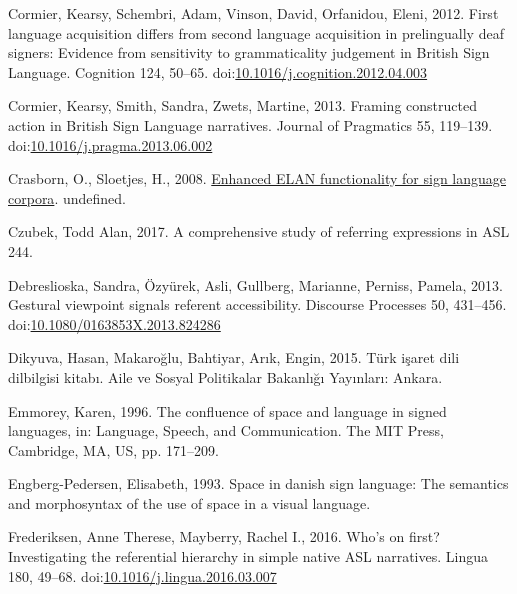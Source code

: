 \documentclass[]{elsarticle} %
\newlength{\cslhangindent}
\newenvironment{CSLReferences}[2] %
 {%
  \setlength{\parindent}{0pt}
  \ifodd #1 \everypar{\setlength{\hangindent}{\cslhangindent}}\ignorespaces\fi
  \ifnum #2 > 0
  \setlength{\parskip}{#2\baselineskip}
  \fi
 }%
 {}
\begin{document}
\begin{CSLReferences}{1}{0}
\leavevmode{}%
Cormier, Kearsy, Schembri, Adam, Vinson, David, Orfanidou, Eleni, 2012.
First language acquisition differs from second language acquisition in
prelingually deaf signers: Evidence from sensitivity to grammaticality
judgement in British Sign Language. Cognition 124, 50--65.
doi:\href{https://doi.org/10.1016/j.cognition.2012.04.003}{10.1016/j.cognition.2012.04.003}

\leavevmode{}%
Cormier, Kearsy, Smith, Sandra, Zwets, Martine, 2013. Framing
constructed action in British Sign Language narratives. Journal of
Pragmatics 55, 119--139.
doi:\href{https://doi.org/10.1016/j.pragma.2013.06.002}{10.1016/j.pragma.2013.06.002}

\leavevmode{}%
Crasborn, O., Sloetjes, H., 2008.
\href{https://www.semanticscholar.org/paper/Enhanced-ELAN-functionality-for-sign-language-Crasborn-Sloetjes/e1623ec6b2bc3532129a3682eb263cc2e7d5389c}{Enhanced
ELAN functionality for sign language corpora}. undefined.

\leavevmode{}%
Czubek, Todd Alan, 2017. A comprehensive study of referring expressions
in ASL 244.

\leavevmode{}%
Debreslioska, Sandra, Özyürek, Asli, Gullberg, Marianne, Perniss,
Pamela, 2013. Gestural viewpoint signals referent accessibility.
Discourse Processes 50, 431--456.
doi:\href{https://doi.org/10.1080/0163853X.2013.824286}{10.1080/0163853X.2013.824286}

\leavevmode{}%
Dikyuva, Hasan, Makaroğlu, Bahtiyar, Arık, Engin, 2015. Türk i{ş}aret
dili dilbilgisi kitab{ı}. Aile ve Sosyal Politikalar Bakanl{ı}{ğ}{ı}
Yay{ı}nlar{ı}: Ankara.

\leavevmode{}%
Emmorey, Karen, 1996. The confluence of space and language in signed
languages, in: Language, Speech, and Communication. The MIT Press,
Cambridge, MA, US, pp. 171--209.

\leavevmode{}%
Engberg-Pedersen, Elisabeth, 1993. Space in danish sign language: The
semantics and morphosyntax of the use of space in a visual language.

\leavevmode{}%
Frederiksen, Anne Therese, Mayberry, Rachel I., 2016. Who's on first?
Investigating the referential hierarchy in simple native ASL narratives.
Lingua 180, 49--68.
doi:\href{https://doi.org/10.1016/j.lingua.2016.03.007}{10.1016/j.lingua.2016.03.007}


\end{CSLReferences}
\end{document}
